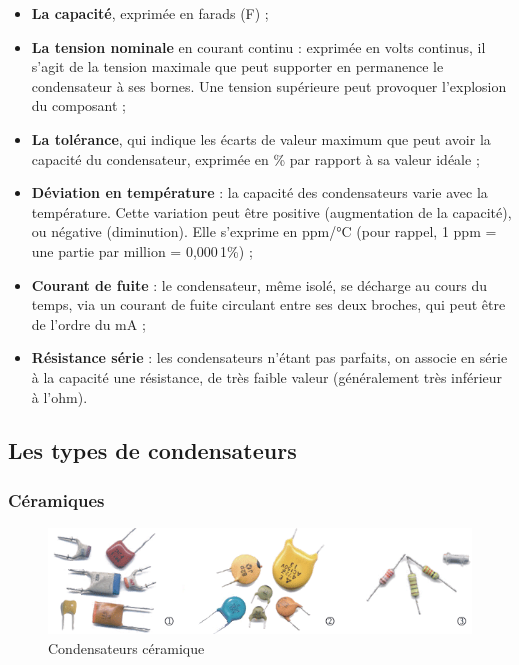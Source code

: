 \documentclass[a4paper]{article}
\begin{document}
\begin{itemize}
	\item \textbf{La capacité}, exprimée en farads (F) ;
	\item \textbf{La tension nominale} en courant continu : exprimée en volts continus, il s'agit de la tension maximale que peut supporter en permanence le condensateur à ses bornes. Une tension supérieure peut provoquer l'explosion du composant ;
	\item \textbf{La tolérance}, qui indique les écarts de valeur maximum que peut avoir la capacité du condensateur, exprimée en \% par rapport à sa valeur idéale ;
	\item \textbf{Déviation en température} : la capacité des condensateurs varie avec la température. Cette variation peut être positive (augmentation de la capacité), ou négative (diminution). Elle s'exprime en ppm/°C (pour rappel, 1 ppm = une partie par million = 0,000\,1\%) ;
	\item \textbf{Courant de fuite} : le condensateur, même isolé, se décharge au cours du temps, via un courant de fuite circulant entre ses deux broches, qui peut être de l'ordre du mA ;
	\item \textbf{Résistance série} : les condensateurs n'étant pas parfaits, on associe en série à la capacité une résistance, de très faible valeur (généralement très inférieur à l'ohm).
\end{itemize}

\subsection{Les types de condensateurs}

\subsubsection{Céramiques}

\begin{figure}[H]
	\centering
	\includegraphics[scale=0.75]{Images/Condensateurs_ceramique.png}
	\caption{Condensateurs céramique
		\label{Condensateurs_ceramique}}
\end{figure}
\end{document}
